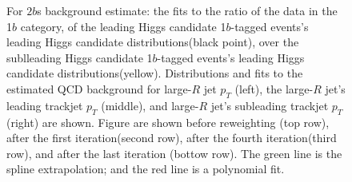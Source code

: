 \begin{figure}[htbp!]
\begin{center}
\caption{For $2b$s background estimate: the fits to the ratio of the data in the 1$b$ category, of the leading Higgs candidate 1$b$-tagged events's leading Higgs candidate distributions(black point), over the sublleading Higgs candidate 1$b$-tagged events's leading Higgs candidate distributions(yellow). Distributions and fits to the estimated QCD background for large-$R$ jet $p_{T}$ (left),  the large-$R$ jet's leading trackjet $p_T$ (middle), and large-$R$ jet's subleading trackjet $p_T$ (right) are shown.  Figure are shown before reweighting (top row), after the first iteration(second row), after the fourth iteration(third row), and after the last iteration (bottow row). The green line is the spline extrapolation; and the red line is a polynomial fit.}
\label{fig:rw-2bs-subl}
\end{center}
\end{figure}

